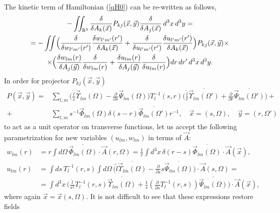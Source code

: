 \documentclass[12pt]{article}
\newcommand{\pl}{\partial}
\newcommand{\ol}{\overline}
\newcommand{\RR}{\mathbb{R}}
\begin{document}
	The kinetic term of Hamiltonian
(\ref{qH0})
	can be re-written as follows,
\begin{multline}
\label{qHkin}
    - \iint_{\RR^{3}} \frac{\delta}{\delta A_{k}(\vec{x})}
	P_{kj}(\vec{x},\vec{y}) \frac{\delta}{\delta A_{j}(\vec{x})}
	\, d^{3}x\, d^{3}y =\\
    = -\iint\Bigl(
\frac{\delta}{\delta w_{l'm'}(r')} \frac{\delta w_{l'm'}(r')}{
    \delta A_{k}(\vec{x})}
+\frac{\delta}{\delta u_{l'm'}(r')}\frac{\delta u_{l'm'}(r')}{
    \delta A_{k}(\vec{x})} \Bigr) P_{kj}(\vec{x},\vec{y}) \times \\
    \times \Bigl(
\frac{\delta w_{lm}(r)}{\delta A_{j}(\vec{y})}
    \frac{\delta}{\delta w_{lm}(r)}
+\frac{\delta u_{lm}(r)}{\delta A_{j}(\vec{y})} \frac{\delta}{\delta u_{lm}(r)}
    \Bigr) dr\, dr'\, d^{3}x\, d^{3}y .
\end{multline}
	In order for projector
$ P_{kj}(\vec{x},\vec{y}) $
\begin{align*}
    P(\vec{x},\vec{y}) =& \sum_{l,m}
\bigl(\frac{\tilde{l}}{s} \vec{\Upsilon}_{lm}(\Omega)
    - \frac{\pl}{\pl s} \vec{\Psi}_{lm}(\Omega) \bigr) T^{-1}_{l}(s,r)
\bigl(\frac{\tilde{l}}{r} \ol{\vec{\Upsilon}_{lm}(\Omega')}
    + \frac{\pl}{\pl r} \ol{\vec{\Psi}_{lm}(\Omega')} \bigr) +\\
 +& \sum_{l,m} s^{-1} \vec{\Phi}_{lm}(\Omega) \delta(s-r)
	\ol{\vec{\Phi}_{lm}(\Omega')} r^{-1} ,
    \quad \vec{x} = (s,\Omega) , \quad \vec{y} = (r, \Omega')
\end{align*}
	to act as a unit operator on transverse functions,
	let us accept the following parametrization for new variables
$ (u_{lm}, w_{lm}) $
	in terms of 
$ \vec{A} $:
\begin{align}
\label{dphiA}
    w_{lm}(r) &= r\int d\Omega \, \ol{\vec{\Phi}_{lm}(\Omega)}\cdot
	\vec{A}(r,\Omega)
	= \frac{1}{r} \int d^{3}x \, \delta(r-s) \ol{\vec{\Phi}_{lm}(\Omega)} \cdot
	    \vec{A}(\vec{x}) , \\
\nonumber
    u_{lm}(r) &= \int ds \, T_{l}^{-1}(r,s) \int d\Omega \,\bigl(
	\tilde{l}\ol{\vec{\Upsilon}_{lm}(\Omega)}
	    -\frac{\pl}{\pl s}s\ol{\vec{\Psi}_{lm}(\Omega)}
	\bigr) \cdot \vec{A}(s,\Omega) =\\
\label{duA}
    &= \int d^{3}x \,
	\bigl(\frac{\tilde{l}}{s^{2}}T_{l}^{-1}(r,s)
	    \ol{\vec{\Upsilon}_{lm}(\Omega)}
+\frac{1}{s}(\frac{\pl}{\pl s}T_{l}^{-1}(r,s))\ol{\vec{\Psi}_{lm}(\Omega)}
	\bigr) \cdot \vec{A}(\vec{x}) ,
\end{align}
	where again
$ \vec{x} = \vec{x}(s,\Omega) $.
	It is not difficult to see that these expressions restore fields
\end{document}
